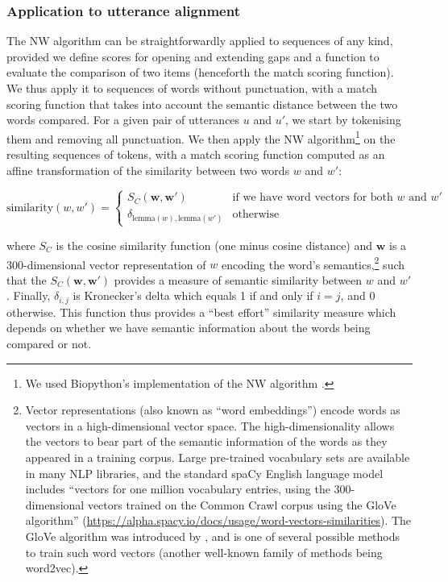 \subsubsection{Application to utterance
alignment}\label{application-to-utterance-alignment}

The NW algorithm can be straightforwardly applied to sequences of any
kind, provided we define scores for opening and extending gaps and a
function to evaluate the comparison of two items (henceforth the match
scoring function). We thus apply it to sequences of words without
punctuation, with a match scoring function that takes into account the
semantic distance between the two words compared. For a given pair of
utterances \(u\) and \(u'\), we start by tokenising them and removing
all punctuation. We then apply the NW algorithm\footnote{We used
  Biopython's implementation of the NW algorithm
  \autocite{cock_biopython:_2009}.} on the resulting sequences of
tokens, with a match scoring function computed as an affine
transformation of the similarity between two words \(w\) and \(w'\):

\[
\text{similarity}(w, w') = \begin{cases}
  S_C \left( \bm{w}, \bm{w}' \right) & \text{if we have word vectors for both $w$ and $w'$} \\
  \delta_{\text{lemma}(w), \text{lemma}(w')} & \text{otherwise}
\end{cases}
\]

where \(S_C\) is the cosine similarity function (one minus cosine
distance) and \(\bm{w}\) is a 300-dimensional vector representation of
\(w\) encoding the word's semantics,\footnote{Vector representations
  (also known as \enquote{word embeddings}) encode words as vectors in a
  high-dimensional vector space. The high-dimensionality allows the
  vectors to bear part of the semantic information of the words as they
  appeared in a training corpus. Large pre-trained vocabulary sets are
  available in many NLP libraries, and the standard spaCy English
  language model includes \enquote{vectors for one million vocabulary
  entries, using the 300-dimensional vectors trained on the Common Crawl
  corpus using the GloVe algorithm}
  (\url{https://alpha.spacy.io/docs/usage/word-vectors-similarities}).
  The GloVe algorithm was introduced by
  \textcite{pennington_glove:_2014}, and is one of several possible
  methods to train such word vectors (another well-known family of
  methods being word2vec).} such that the \(S_C(\bm{w}, \bm{w}')\)
provides a measure of semantic similarity between \(w\) and \(w'\).
Finally, \(\delta_{i,j}\) is Kronecker's delta which equals 1 if and
only if \(i = j\), and 0 otherwise. This function thus provides a
\enquote{best effort} similarity measure which depends on whether we
have semantic information about the words being compared or not.

